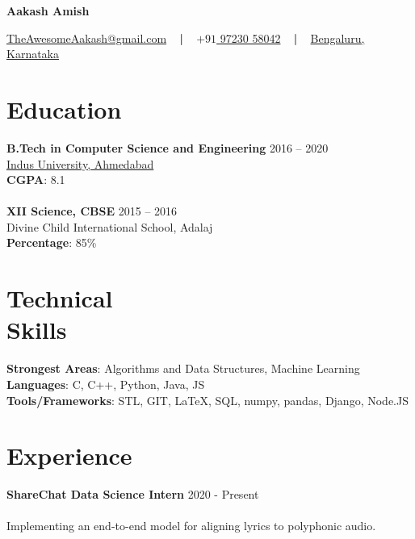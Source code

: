 \documentclass[margin, centered]{res}
\begin{document}
	\begin{center}
		\hspace{-\hoffset}
		\huge\bf{Aakash Amish}
	\end{center}
	\begin{center}
		\hspace{-\hoffset}
		\href{mailto:theawesomeaakash@gmail.com}{TheAwesomeAakash@gmail.com}
		~ \textbf{|} ~
		\href{tel:+919723058042}{\(+91\) 97230 58042}
		~ \textbf{|} ~
		\href{https://goo.gl/maps/wFwycVLLuPHNh7nCA}{Bengaluru, Karnataka}
	\end{center}

	\begin{resume}
		\section{Education}
			\textbf{B.Tech in Computer Science and Engineering} \hfill 2016 – 2020 \\
			\href{https://www.indusuni.ac.in/}{Indus University, Ahmedabad}\\
			\textbf{CGPA}: 8.1 \\ 
			\\
			\textbf{XII Science, CBSE} \hfill 2015 – 2016 \\
			Divine Child International School, Adalaj \\
			\textbf{Percentage}: 85\%
		
		\section{Technical \\ Skills}
			\textbf{Strongest Areas}: Algorithms and Data Structures, Machine Learning\\
			\textbf{Languages}: C, C++, Python, Java, JS\\
			\textbf{Tools/Frameworks}: STL, GIT, \LaTeX, SQL, numpy, pandas, Django, Node.JS

		\section{Experience}
			\textbf{ShareChat Data Science Intern} \hfill 2020 - Present \\ \\
			Implementing an end-to-end model for aligning lyrics to polyphonic audio.
		

\end{resume}
\end{document}
